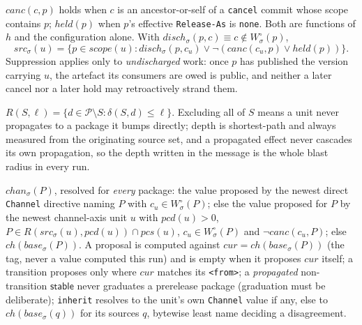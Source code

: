 \documentclass[sigconf,nonacm]{acmart}
\newcommand{\code}[1]{\texttt{#1}}
\begin{document}
\begin{definition}
\label{def:src}
$\mathit{canc}(c,p)$ holds when $c$ is an ancestor-or-self of a
\code{cancel} commit whose scope contains $p$; $\mathit{held}(p)$ when
$p$'s effective \code{Release-As} is \code{none}. Both are functions of
$h$ and the configuration alone. With $\mathit{disch}_\sigma(p,c)
\equiv c \notin W^\circ_\sigma(p)$,
\begin{equation}
  \mathit{src}_\sigma(u) = \{ p \in \mathit{scope}(u) :
    \mathit{disch}_\sigma(p,c_u) \lor
    \lnot(\mathit{canc}(c_u,p) \lor \mathit{held}(p)) \}.
  \label{eq:src}
\end{equation}
Suppression applies only to \emph{undischarged} work: once $p$ has
published the version carrying $u$, the artefact its consumers are owed
is public, and neither a later cancel nor a later hold may retroactively
strand them.
\end{definition}

\begin{definition}[reach]
\label{def:reach}
$R(S,\ell) = \{ d \in \mathcal{P} \setminus S : \delta(S,d) \leq \ell
\}$. Excluding all of $S$ means a unit never propagates to a package it
bumps directly; depth is shortest-path and always measured from the
originating source set, and a propagated effect never cascades its own
propagation, so the depth written in the message is the whole blast
radius in every run.
\end{definition}

\begin{definition}[channels]
\label{def:chan}
$\mathit{chan}_\sigma(P)$, resolved for \emph{every} package: the value
proposed by the newest direct \code{Channel} directive naming $P$ with
$c_u \in W^\circ_\sigma(P)$; else the value proposed for $P$ by the newest
channel-axis unit $u$ with $\mathit{pcd}(u) > 0$, $P \in
R(\mathit{src}_\sigma(u), \mathit{pcd}(u)) \cap \mathit{pcs}(u)$,
$c_u \in W^\circ_\sigma(P)$ and $\lnot\mathit{canc}(c_u,P)$; else
$\mathit{ch}(\mathit{base}_\sigma(P))$. A proposal is computed against
$\mathit{cur} = \mathit{ch}(\mathit{base}_\sigma(P))$ (the tag, never
a value computed this run) and is empty when it proposes
$\mathit{cur}$ itself; a transition proposes only where $\mathit{cur}$
matches its \code{<from>}; a \emph{propagated} non-transition
$\mathsf{stable}$ never graduates a prerelease package (graduation must
be deliberate); \code{inherit} resolves to the unit's own
\code{Channel} value if any, else to
$\mathit{ch}(\mathit{base}_\sigma(q))$ for its sources $q$, bytewise
least name deciding a disagreement.
\end{definition}
\end{document}
